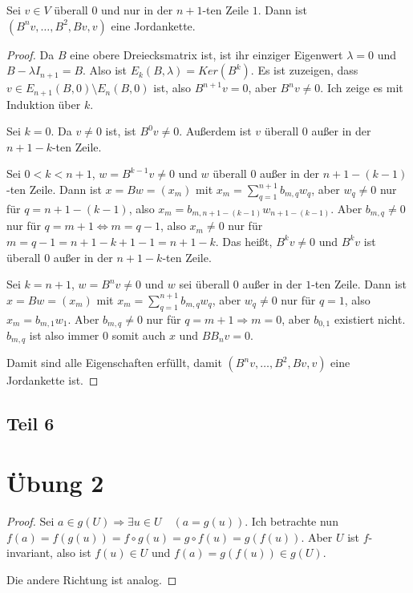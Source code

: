 \documentclass[10pt,a4paper]{article}
\begin{document}
Sei $v \in V$ überall $0$ und nur in der $n + 1$-ten Zeile $1$.
Dann ist $(B^{n}v, \dots, B^{2}, Bv, v)$ eine Jordankette.

\begin{proof}
Da $B$ eine obere Dreiecksmatrix ist, ist ihr einziger Eigenwert $\lambda = 0$ und $B - \lambda I_{n + 1} = B$.
Also ist $E_{k}(B, \lambda) = Ker(B^{k})$. 
Es ist zuzeigen, dass $v \in E_{n + 1}(B, 0) \setminus E_{n}(B, 0)$ ist, also $B^{n + 1}v = 0$, aber $B^{n}v \ne 0$.
Ich zeige es mit Induktion über $k$.

Sei $k = 0$.
Da $v \ne 0$ ist, ist $B^{0}v \ne 0$.
Außerdem ist $v$ überall $0$ außer in der $n + 1 - k$-ten Zeile.

Sei $0 < k < n + 1$, $w = B^{k - 1}v \ne 0$ und $w$ überall $0$ außer in der $n + 1 - (k - 1)$-ten Zeile.
Dann ist $x = Bw = (x_{m})$ mit $x_{m} = \sum_{q = 1}^{n + 1} b_{m, q} w_{q}$, aber $w_{q} \ne 0$ nur für $q = n + 1 - (k - 1)$, also $x_{m} = b_{m, n + 1 - (k - 1)} w_{n + 1 - (k - 1)}$.
Aber $b_{m, q} \ne 0$ nur für $q = m + 1 \Leftrightarrow m = q - 1$, also $x_{m} \ne 0$ nur für $m = q - 1 = n + 1 - k + 1 - 1 = n + 1 - k$.
Das heißt, $B^{k}v \ne 0$ und $B^{k}v$ ist überall $0$ außer in der $n + 1 - k$-ten Zeile.

Sei $k = n + 1$, $w = B^{n}v \ne 0$ und $w$ sei überall $0$ außer in der $1$-ten Zeile.
Dann ist $x = Bw = (x_{m})$ mit $x_{m} = \sum_{q = 1}^{n + 1} b_{m, q} w_{q}$, aber $w_{q} \ne 0$ nur für $q = 1$, also $x_{m} = b_{m, 1} w_{1}$.
Aber $b_{m, q} \ne 0$ nur für $q = m + 1 \Rightarrow m = 0$, aber $b_{0, 1}$ existiert nicht.
$b_{m, q}$ ist also immer $0$ somit auch $x$ und $BB_{n}v = 0$.

Damit sind alle Eigenschaften erfüllt, damit $(B^{n}v, \dots, B^{2}, Bv, v)$ eine Jordankette ist.
\end{proof}

\subsection*{Teil 6}

\section*{Übung 2}

\begin{proof}
Sei $a \in g(U) \Rightarrow \exists u \in U \quad (a = g(u))$.
Ich betrachte nun $f(a) = f(g(u)) = f \circ g(u) = g \circ f(u) = g(f(u))$.
Aber $U$ ist $f$-invariant, also ist $f(u) \in U$ und $f(a) = g(f(u)) \in g(U)$.

Die andere Richtung ist analog.
\end{proof}
\end{document}
